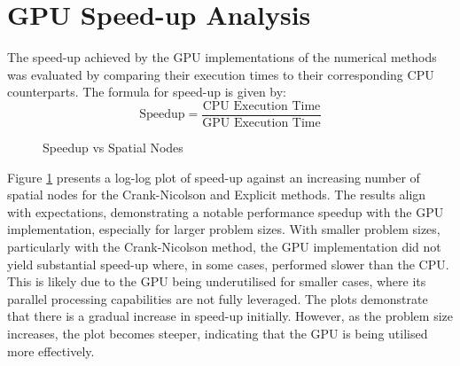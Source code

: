 \section{GPU Speed-up Analysis}\label{sec:speedup_analysis}
The speed-up achieved by the GPU implementations of the numerical methods was evaluated by comparing their execution times to their corresponding CPU counterparts. The formula for speed-up is given by:
\begin{equation}
    \text{Speedup} = \frac{\text{CPU Execution Time}}{\text{GPU Execution Time}}
\end{equation}
\begin{figure}[H]
    \centering
    \caption{Speedup vs Spatial Nodes}
    \label{fig:speedup-bse}
\end{figure}

Figure \ref{fig:speedup-bse} presents a log-log plot of speed-up against an increasing number of spatial nodes for the Crank-Nicolson and Explicit methods. The results align with expectations, demonstrating a notable performance speedup with the GPU implementation, especially for larger problem sizes. With smaller problem sizes, particularly with the Crank-Nicolson method, the GPU implementation did not yield substantial speed-up where, in some cases, performed slower than the CPU. This is likely due to the GPU being underutilised for smaller cases, where its parallel processing capabilities are not fully leveraged. The plots demonstrate that there is a gradual increase in speed-up initially. However, as the problem size increases, the plot becomes steeper, indicating that the GPU is being utilised more effectively.

